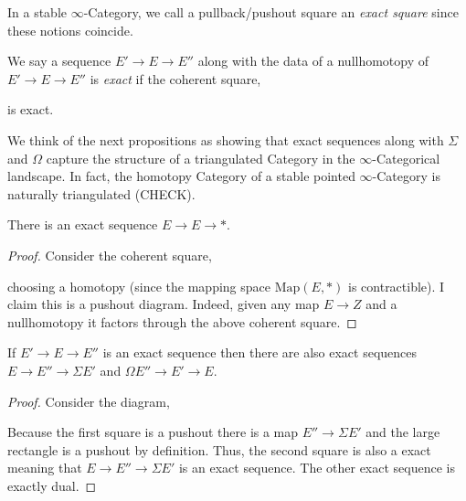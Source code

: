 \documentclass[12pt]{extarticle}
\begin{document}
\begin{rmk}
In a stable $\infty$-Category, we call a pullback/pushout square an \textit{exact square} since these notions coincide.
\end{rmk}

\begin{defn}
We say a sequence $E' \to E \to E''$ along with the data of a nullhomotopy of $E' \to E \to E''$ is \textit{exact} if the coherent square,
\begin{center}
\end{center}
is exact.
\end{defn}

\begin{rmk}
We think of the next propositions as showing that exact sequences along with $\Sigma$ and $\Omega$ capture the structure of a triangulated Category in the $\infty$-Categorical landscape. In fact, the homotopy Category of a stable pointed $\infty$-Category is naturally triangulated (CHECK).
\end{rmk}

\begin{prop}
There is an exact sequence $E \to E \to *$.
\end{prop}

\begin{proof}
Consider the coherent square,
\begin{center}
\end{center}
choosing a homotopy (since the mapping space $\mathrm{Map}(E, *)$ is contractible). I claim this is a pushout diagram. Indeed, given any map $E \to Z$ and a nullhomotopy it factors through the above coherent square.
\end{proof}

\begin{prop}
If $E' \to E \to E''$ is an exact sequence then there are also exact sequences $E \to E'' \to \Sigma E'$ and $\Omega E'' \to E' \to E$.
\end{prop}

\begin{proof}
Consider the diagram,
\begin{center}
\end{center}
Because the first square is a pushout there is a map $E'' \to \Sigma E'$ and the large rectangle is a pushout by definition. Thus, the second square is also a exact meaning that $E \to E'' \to \Sigma E'$ is an exact sequence. The other exact sequence is exactly dual.
\end{proof}
\end{document}

